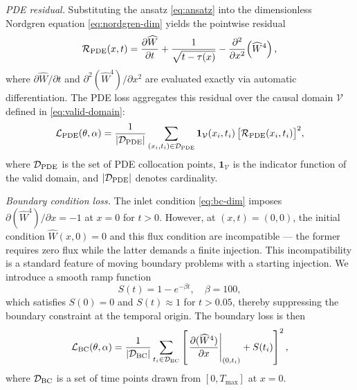 \documentclass[a4paper,fleqn]{cas-sc}
\begin{document}
\medskip
\noindent\textit{PDE residual.}
Substituting the ansatz \eqref{eq:ansatz} into the dimensionless
Nordgren equation \eqref{eq:nordgren-dim} yields the pointwise
residual
\begin{equation}
  \mathcal{R}_{\rm PDE}(x, t)
  = \frac{\partial \widehat{W}}{\partial t}
    + \frac{1}{\sqrt{t - \tau(x)}}
    - \frac{\partial^{2}}{\partial x^{2}}\!\left(\widehat{W}^{4}\right),
  \label{eq:pde-residual}
\end{equation}
where $\partial\widehat{W}/\partial t$ and
$\partial^{2}(\widehat{W}^{4})/\partial x^{2}$ are evaluated exactly
via automatic differentiation. The PDE loss aggregates this residual
over the causal domain $\mathcal{V}$ defined in
\eqref{eq:valid-domain}:
\begin{equation}
  \mathcal{L}_{\rm PDE}(\theta, \alpha)
  = \frac{1}{|\mathcal{D}_{\rm PDE}|}
    \sum_{(x_i, t_i) \in \mathcal{D}_{\rm PDE}}
    \mathbf{1}_{\mathcal{V}}(x_i, t_i)\,
    \bigl[\mathcal{R}_{\rm PDE}(x_i, t_i)\bigr]^{2},
  \label{eq:loss-pde}
\end{equation}
where $\mathcal{D}_{\rm PDE}$ is the set of PDE collocation points,
$\mathbf{1}_{\mathcal{V}}$ is the indicator function of the valid
domain, and $|\mathcal{D}_{\rm PDE}|$ denotes cardinality.

\medskip
\noindent\textit{Boundary condition loss.}
The inlet condition \eqref{eq:bc-dim} imposes
$\partial(\widehat{W}^{4})/\partial x = -1$ at $x = 0$ for $t > 0$.
However, at $(x,t) = (0,0)$, the initial condition
$\widehat{W}(x,0) = 0$ and this flux condition are incompatible ---
the former requires zero flux while the latter demands a finite
injection. This incompatibility is a standard feature of moving
boundary problems with a starting injection. We introduce a smooth
ramp function
\begin{equation}
  S(t) = 1 - e^{-\beta t}, \quad \beta = 100,
  \label{eq:ramp}
\end{equation}
which satisfies $S(0) = 0$ and $S(t) \approx 1$ for $t > 0.05$,
thereby suppressing the boundary constraint at the temporal origin.
The boundary loss is then
\begin{equation}
  \mathcal{L}_{\rm BC}(\theta, \alpha)
  = \frac{1}{|\mathcal{D}_{\rm BC}|}
    \sum_{t_i \in \mathcal{D}_{\rm BC}}
    \left[
      \left.\frac{\partial(\widehat{W}^{4})}{\partial x}\right|_{(0, t_i)}
      + S(t_i)
    \right]^{2},
  \label{eq:loss-bc}
\end{equation}
where $\mathcal{D}_{\rm BC}$ is a set of time points drawn from
$[0, T_{\max}]$ at $x = 0$.
\end{document}
